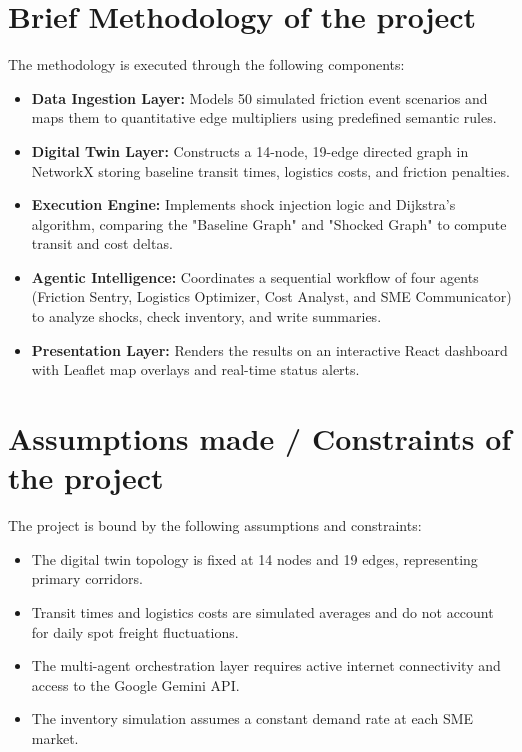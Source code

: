 \section[Brief Methodology of the project]{\textbf{Brief Methodology of the project}}
The methodology is executed through the following components:
\begin{itemize}
    \item \textbf{Data Ingestion Layer:} Models 50 simulated friction event scenarios and maps them to quantitative edge multipliers using predefined semantic rules.
    \item \textbf{Digital Twin Layer:} Constructs a 14-node, 19-edge directed graph in NetworkX storing baseline transit times, logistics costs, and friction penalties.
    \item \textbf{Execution Engine:} Implements shock injection logic and Dijkstra's algorithm, comparing the "Baseline Graph" and "Shocked Graph" to compute transit and cost deltas.
    \item \textbf{Agentic Intelligence:} Coordinates a sequential workflow of four agents (Friction Sentry, Logistics Optimizer, Cost Analyst, and SME Communicator) to analyze shocks, check inventory, and write summaries.
    \item \textbf{Presentation Layer:} Renders the results on an interactive React dashboard with Leaflet map overlays and real-time status alerts.
\end{itemize}

\section[Assumptions made / Constraints of the project]{\textbf{Assumptions made / Constraints of the project}}
The project is bound by the following assumptions and constraints:
\begin{itemize}
\item The digital twin topology is fixed at 14 nodes and 19 edges, representing primary corridors.
\item Transit times and logistics costs are simulated averages and do not account for daily spot freight fluctuations.
\item The multi-agent orchestration layer requires active internet connectivity and access to the Google Gemini API.
\item The inventory simulation assumes a constant demand rate at each SME market.
\end{itemize}

